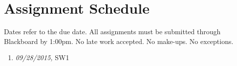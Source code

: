\documentclass[article,oneside]{memoir}
\begin{document}
\section{ Assignment Schedule}
Dates refer to the due date. All assignments must be submitted through Blackboard by 1:00pm. No late work accepted. No make-ups. No exceptions. 

\begin{enumerate}
\item \textit{09/28/2015,} SW1
\end{enumerate}




\end{document}
